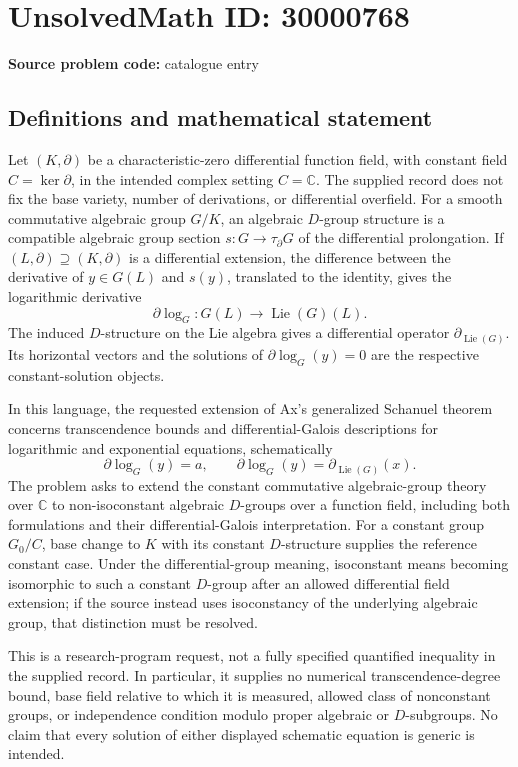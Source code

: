 \documentclass[11pt]{article}
\newcommand{\C}{\mathbb{C}}
\begin{document}
\section*{UnsolvedMath ID: 30000768}
\textbf{Source problem code:} catalogue entry
\subsection{Definitions and mathematical statement}
Let \((K,\partial)\) be a characteristic-zero differential function field, with constant field \(C=\ker\partial\), in the intended complex setting \(C=\C\). The supplied record does not fix the base variety, number of derivations, or differential overfield. For a smooth commutative algebraic group \(G/K\), an algebraic \(D\)-group structure is a compatible algebraic group section \(s:G\to\tau_\partial G\) of the differential prolongation. If \((L,\partial)\supseteq(K,\partial)\) is a differential extension, the difference between the derivative of \(y\in G(L)\) and \(s(y)\), translated to the identity, gives the logarithmic derivative
\[
 \partial\log_G:G(L)\longrightarrow\operatorname{Lie}(G)(L).
\]
The induced \(D\)-structure on the Lie algebra gives a differential operator \(\partial_{\operatorname{Lie}(G)}\). Its horizontal vectors and the solutions of \(\partial\log_G(y)=0\) are the respective constant-solution objects.

In this language, the requested extension of Ax's generalized Schanuel theorem concerns transcendence bounds and differential-Galois descriptions for logarithmic and exponential equations, schematically
\[
 \partial\log_G(y)=a,
 \qquad
 \partial\log_G(y)=\partial_{\operatorname{Lie}(G)}(x).
\]
The problem asks to extend the constant commutative algebraic-group theory over \(\C\) to non-isoconstant algebraic \(D\)-groups over a function field, including both formulations and their differential-Galois interpretation. For a constant group \(G_0/C\), base change to \(K\) with its constant \(D\)-structure supplies the reference constant case. Under the differential-group meaning, isoconstant means becoming isomorphic to such a constant \(D\)-group after an allowed differential field extension; if the source instead uses isoconstancy of the underlying algebraic group, that distinction must be resolved.

This is a research-program request, not a fully specified quantified inequality in the supplied record. In particular, it supplies no numerical transcendence-degree bound, base field relative to which it is measured, allowed class of nonconstant groups, or independence condition modulo proper algebraic or \(D\)-subgroups. No claim that every solution of either displayed schematic equation is generic is intended.
\end{document}
